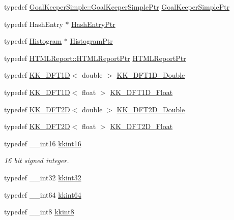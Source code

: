 \begin{DoxyCompactItemize}
\item 
typedef \hyperlink{class_k_k_b_1_1_goal_keeper_simple_a5e73be577d62a04e6980bb94027f653b}{Goal\+Keeper\+Simple\+::\+Goal\+Keeper\+Simple\+Ptr} \hyperlink{namespace_k_k_b_a809c0531dcbb9300a8a80291ec5896ab}{Goal\+Keeper\+Simple\+Ptr}
\item 
typedef Hash\+Entry $\ast$ \hyperlink{namespace_k_k_b_a52f8dc7216f438c7d92cb730d1e4281a}{Hash\+Entry\+Ptr}
\item 
typedef \hyperlink{class_k_k_b_1_1_histogram}{Histogram} $\ast$ \hyperlink{namespace_k_k_b_a48b9611558f2c43f7ee877adb475b286}{Histogram\+Ptr}
\item 
typedef \hyperlink{class_k_k_b_1_1_h_t_m_l_report_a8b68e502b29c1e631f43ba1514bb4c67}{H\+T\+M\+L\+Report\+::\+H\+T\+M\+L\+Report\+Ptr} \hyperlink{namespace_k_k_b_a9794ab43b4b17d680dd505d0f2550c92}{H\+T\+M\+L\+Report\+Ptr}
\item 
typedef \hyperlink{class_k_k_b_1_1_k_k___d_f_t1_d}{K\+K\+\_\+\+D\+F\+T1D}$<$ double $>$ \hyperlink{namespace_k_k_b_a9f9fb078a5aaeb09741729807bc85c14}{K\+K\+\_\+\+D\+F\+T1\+D\+\_\+\+Double}
\item 
typedef \hyperlink{class_k_k_b_1_1_k_k___d_f_t1_d}{K\+K\+\_\+\+D\+F\+T1D}$<$ float $>$ \hyperlink{namespace_k_k_b_a34ec4e0146fdb71ad05eab5ef0461f86}{K\+K\+\_\+\+D\+F\+T1\+D\+\_\+\+Float}
\item 
typedef \hyperlink{class_k_k_b_1_1_k_k___d_f_t2_d}{K\+K\+\_\+\+D\+F\+T2D}$<$ double $>$ \hyperlink{namespace_k_k_b_adb0ab9433c6a13b95921ed75ce88e69f}{K\+K\+\_\+\+D\+F\+T2\+D\+\_\+\+Double}
\item 
typedef \hyperlink{class_k_k_b_1_1_k_k___d_f_t2_d}{K\+K\+\_\+\+D\+F\+T2D}$<$ float $>$ \hyperlink{namespace_k_k_b_a7de386112eca309c8ef4daddd5b64c8b}{K\+K\+\_\+\+D\+F\+T2\+D\+\_\+\+Float}
\item 
typedef \+\_\+\+\_\+int16 \hyperlink{namespace_k_k_b_a93809780ee294124dda4c23069f41248}{kkint16}
\begin{DoxyCompactList}\small\item\em 16 bit signed integer. \end{DoxyCompactList}\item 
typedef \+\_\+\+\_\+int32 \hyperlink{namespace_k_k_b_a8fa4952cc84fda1de4bec1fbdd8d5b1b}{kkint32}
\item 
typedef \+\_\+\+\_\+int64 \hyperlink{namespace_k_k_b_aa3486b1c5ea9162b3b020c69f72826eb}{kkint64}
\item 
typedef \+\_\+\+\_\+int8 \hyperlink{namespace_k_k_b_af3afe438e33eee4e63728d59803872c7}{kkint8}

\end{DoxyCompactItemize}
